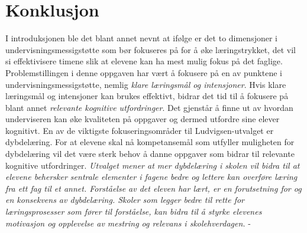 \documentclass[main.tex]{subfiles}
\begin{document}
\section*{Konklusjon}
\label{sec:6}

I introduksjonen ble det blant annet nevnt at ifølge  er det to dimensjoner i undervisningsmessigstøtte som bør
fokuseres på for å øke læringstrykket, det vil si effektivisere timene slik at elevene kan ha mest mulig fokus på det faglige.
Problemstillingen i denne oppgaven har vært å fokusere på en av punktene i undervisningsmessigstøtte, nemlig \emph{klare 
læringsmål og intensjoner}. Hvis klare læringsmål og intensjoner kan brukes effektivt, bidrar det tid til å fokusere på blant annet
\emph{relevante kognitive utfordringer}. Det gjenstår å finne ut av hvordan underviseren kan øke kvaliteten på oppgaver og
dermed utfordre sine elever kognitivt. En av de viktigste fokuseringsområder til Ludvigsen-utvalget er dybdelæring. For at elevene
skal nå kompetansemål som utfyller muligheten for dybdelæring vil det være sterk behov å danne oppgaver som bidrar til relevante
kognitive utfordringer. 
\newline
\newline
\emph{
Utvalget mener at mer dybdelæring i skolen
vil bidra til at elevene behersker sentrale elementer
i fagene bedre og lettere kan overføre læring
fra ett fag til et annet. Forståelse av det eleven har
lært, er en forutsetning for og en konsekvens av
dybdelæring. Skoler som legger bedre til rette for
læringsprosesser som fører til forståelse, kan
bidra til å styrke elevenes motivasjon og opplevelse
av mestring og relevans i skolehverdagen.} - 
\end{document}
